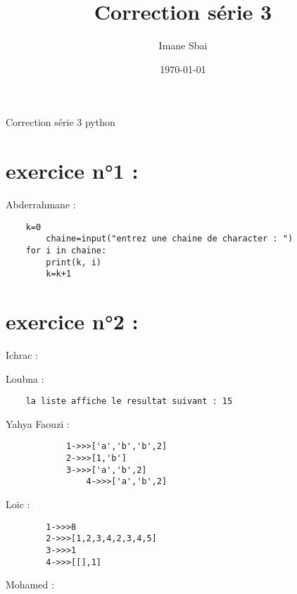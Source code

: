\documentclass{article}
\title{Correction série 3}
\author{Imane Sbai}
\date {\today}
\begin{document}
\begin{titlepage}
    \begin{center}
Correction s\'{e}rie 3 python
    \end{center}
\end{titlepage}

\section{exercice n°1 :}
	\begin{center}
    		Abderrahmane :
	\end{center} 
	
	\begin{verbatim}
	k=0
    	chaine=input("entrez une chaine de character : ")
	for i in chaine:
   		print(k, i)
	   	k=k+1
	\end{verbatim}
\section{exercice n°2 :}

	\begin{center}
    		Ichrac :
	\end{center}
	
	
	\begin{center}
    		Loubna :
	\end{center} 
	\begin{verbatim}
	la liste affiche le resultat suivant : 15
        \end{verbatim}
        \begin{center}
    		 Yahya Faouzi :
	\end{center}    	  
        	
    	\begin{verbatim}
        	1->>>['a','b','b',2]
	    	2->>>[1,'b']
	    	3->>>['a','b',2]
                4->>>['a','b',2]

        \end{verbatim}
         
	\begin{center}
    		Loic :
	\end{center} 
	
	\begin{verbatim}
		1->>>8
		2->>>[1,2,3,4,2,3,4,5]
		3->>>1
		4->>>[[],1]
	\end{verbatim}
	
	\begin{center}
    		Mohamed :
	\end{center}
	
\end{document}
